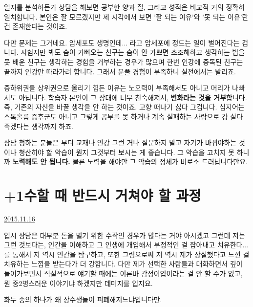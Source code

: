 일지를 분석하든가 상담을 해보면
공부한 양과 질, 그리고 성적은 비교적 거의 정확히 일치합니다.
본인은 잘 모르겠지만 제 시각에서 보면 '잘 되는 이유'와 '못 되는 이유'란 건 존재한다는 것이죠.
\vspace{5mm}

다만 문제는 그거네요.
암세포도 생명인데... 라고 암세포에 정드는 일이 벌어진다는 겁니다.
시험지만 봐도 숨이 가빠오는 친구는 숨이 안 가쁘면 초조해하고
생각하는 법을 못 배운 친구는 생각하는 경험을 거부하는 경우가 많으며
한번 인강에 중독된 친구는 끝까지 인강만 따라가려 합니다. 그래서 문풀 경험이 부족하니 실전에서는 발리죠.
\vspace{5mm}

중하위권을 상위권으로 올리기 힘든 이유는
노오력이 부족해서도 아니고 머리가 나빠서도 아닙니다.
학습자 본인이 그 상태에 너무 친숙해져서, \textbf{변화라는 것을 거부}합니다.
즉, 기존의 자신을 바꿀 생각을 안 하는 것이죠. 고향 떠나기 싫다 그겁니다.
심지어는 스톡홀름 증후군도 아니고 그렇게 공부를 못 하거나 계속 실패하는 사람으로 걍 살다 죽겠다는 생각까지 하죠.
\vspace{5mm}

상담 청하는 분들은 부디 교재나 인강 그런 거나 질문하지 말고
자기가 바꿔야하는 것이나 청산히야 할 악습이 뭔지 그것부터 보시는 게 좋습니다.
그 악습을 고치지 못 하니까 \textbf{노력해도 안 됩니다.}
물론 노력을 해야만 그 악습의 정체가 비로소 드러납니다만요.
\vspace{5mm}






\section{+1수할 때 반드시 거쳐야 할 과정}
\href{https://www.kockoc.com/Apoc/493832}{2015.11.16}

\vspace{5mm}

입시 상담은 대부분 돈을 벌기 위한 수작인 경우가 많다는 거야 아시겠고
그런데 저는 그런 것보다는, 인간을 이해하고 그 인생에 개입해서 부정적인 걸 잡아내고 치유한다... 를 통해서
저 역시 인간을 탐구하고, 또한 그럼으로써 저 역시 제가 상실했다고 느낀 걸 치유하는 느낌을 받는다가 더 강합니다.
다만 제가 선택한 사람들과 대화하면서 깊이 들어가보면서 직설적으로 얘기할 때에는
이른바 감정이입이라는 걸 안 할 수가 없고, 뭔 중2병스러운 이야기냐 하겠지만 데미지를 입지요.
\vspace{5mm}

화두 중의 하나가 왜 장수생들이 피폐해지느냐입니다만.
\vspace{5mm}

